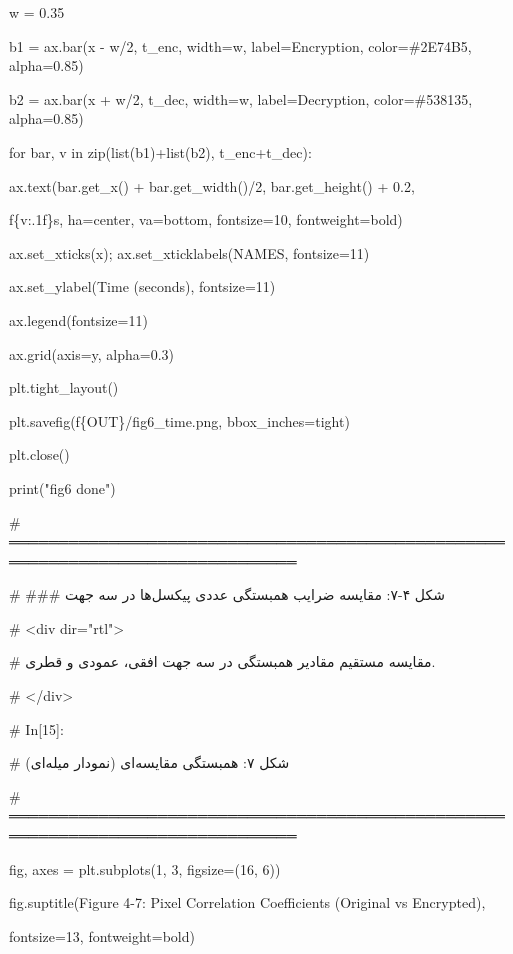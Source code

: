 w = 0.35

b1 = ax.bar(x - w/2, t\_enc, width=w, label=\textquotesingle Encryption\textquotesingle, color=\textquotesingle\#2E74B5\textquotesingle, alpha=0.85)

b2 = ax.bar(x + w/2, t\_dec, width=w, label=\textquotesingle Decryption\textquotesingle, color=\textquotesingle\#538135\textquotesingle, alpha=0.85)

for bar, v in zip(list(b1)+list(b2), t\_enc+t\_dec):

ax.text(bar.get\_x() + bar.get\_width()/2, bar.get\_height() + 0.2,

f\textquotesingle\{v:.1f\}s\textquotesingle, ha=\textquotesingle center\textquotesingle, va=\textquotesingle bottom\textquotesingle, fontsize=10, fontweight=\textquotesingle bold\textquotesingle)

ax.set\_xticks(x); ax.set\_xticklabels(NAMES, fontsize=11)

ax.set\_ylabel(\textquotesingle Time (seconds)\textquotesingle, fontsize=11)

ax.legend(fontsize=11)

ax.grid(axis=\textquotesingle y\textquotesingle, alpha=0.3)

plt.tight\_layout()

plt.savefig(f\textquotesingle\{OUT\}/fig6\_time.png\textquotesingle, bbox\_inches=\textquotesingle tight\textquotesingle)

plt.close()

print("fig6 done")

\# ═══════════════════════════════════════════════════════════════════════════════

\# \#\#\# شکل ۴-۷: مقایسه ضرایب همبستگی عددی پیکسل‌ها در سه جهت

\# \textless div dir="rtl"\textgreater{}

\# مقایسه مستقیم مقادیر همبستگی در سه جهت افقی، عمودی و قطری.

\# \textless/div\textgreater{}

\# In{[}15{]}:

\# شکل ۷: همبستگی مقایسه‌ای (نمودار میله‌ای)

\# ═══════════════════════════════════════════════════════════════════════════════

fig, axes = plt.subplots(1, 3, figsize=(16, 6))

fig.suptitle(\textquotesingle Figure 4-7: Pixel Correlation Coefficients (Original vs Encrypted)\textquotesingle,

fontsize=13, fontweight=\textquotesingle bold\textquotesingle)

